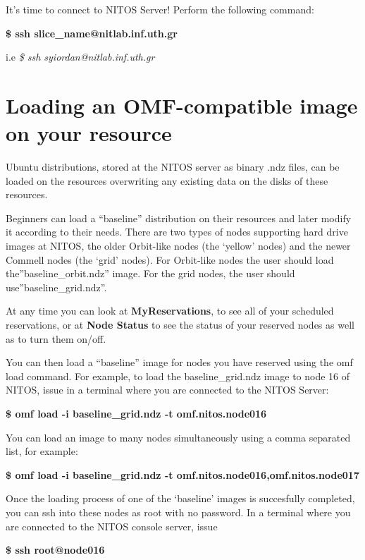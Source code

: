 \documentclass[letterpaper,10pt,english]{sphinxmanual}
\begin{document}
It's time to connect to NITOS Server!
Perform the following command:

\begin{DUlineblock}{0em}
\item[] \textbf{\$ ssh slice\_name@nitlab.inf.uth.gr}
\item[] i.e \emph{\$ ssh syiordan@nitlab.inf.uth.gr}
\end{DUlineblock}


\section{Loading an OMF-compatible image on your resource}
\label{loadOMF:label-name-2}\label{loadOMF::doc}\label{loadOMF:loading-an-omf-compatible-image-on-your-resource}
Ubuntu distributions, stored at the NITOS server as binary .ndz files, can be loaded on the resources overwriting any existing data on the disks of these resources.

Beginners can load a ``baseline'' distribution on their resources and later modify it according to their needs. There are two types of nodes supporting hard drive images at NITOS, the older Orbit-like nodes (the `yellow' nodes) and the newer Commell nodes (the `grid' nodes). For Orbit-like nodes the user should load the''baseline\_orbit.ndz'' image. For the grid nodes, the user should  use''baseline\_grid.ndz''.

At any time you can look at \textbf{MyReservations}, to see all of your scheduled reservations, or at \textbf{Node Status} to see the status of your reserved nodes as well as to turn them on/off.

You can then load a ``baseline'' image for nodes you have reserved using the omf load command. For example, to load the baseline\_grid.ndz image to node 16 of NITOS, issue in a terminal where you are connected to the NITOS Server:

\textbf{\$ omf load -i baseline\_grid.ndz -t omf.nitos.node016}

You can load an image to many nodes simultaneously using a comma separated list, for example:

\textbf{\$ omf load -i baseline\_grid.ndz -t omf.nitos.node016,omf.nitos.node017}

Once the loading process of one of the `baseline' images is succesfully completed, you can ssh into these nodes as root with no password. In a terminal where you are connected to the NITOS console server, issue

\textbf{\$ ssh root@node016}
\end{document}
